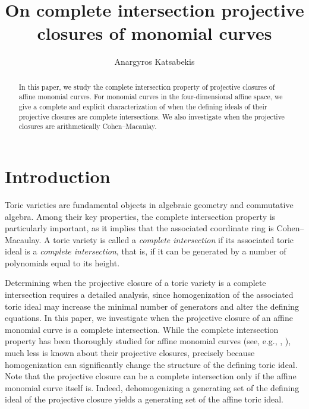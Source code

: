 \documentclass[10pt]{amsart}
\begin{document}
\title[]
{On complete intersection projective closures of monomial curves}
\author[]{Anargyros Katsabekis}
\address {Department of Mathematics, University of Ioannina, 45110 Ioannina, Greece} 




\begin{abstract} In this paper, we study the complete intersection property of projective closures of affine monomial curves. For monomial curves in the four-dimensional affine space, we give a complete and explicit characterization of when the defining ideals of their projective closures are complete intersections. We also investigate when the projective closures are arithmetically Cohen--Macaulay.
\end{abstract}
\maketitle





\section{Introduction}

Toric varieties are fundamental objects in algebraic geometry and commutative algebra. Among their key properties, the complete intersection property is particularly important, as it implies that the associated coordinate ring is Cohen--Macaulay. A toric variety is called a {\em complete intersection} if its associated toric ideal is a {\em complete intersection}, that is, if it can be generated by a number of polynomials equal to its height.

Determining when the projective closure of a toric variety is a complete intersection requires a detailed analysis, since homogenization of the associated toric ideal may increase the minimal number of generators and alter the defining equations. In this paper, we investigate when the projective closure of an affine monomial curve is a complete intersection. While the complete intersection property has been thoroughly studied for affine monomial curves (see, e.g., \cite{Bresinsky75}, \cite{Her}), much less is known about
their projective closures, precisely because homogenization can significantly
change the structure of the defining toric ideal. Note that the projective closure can be a complete intersection only if the affine monomial curve itself is. Indeed, dehomogenizing a generating set of the defining ideal of the projective closure yields a generating set of the affine toric ideal.
\end{document}
